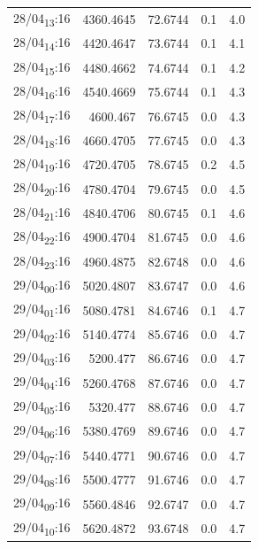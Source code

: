 \documentclass[11pt]{article}
\begin{document}
\begin{table}[htbp]
\begin{tabular}{lrrrr}
28/04\textsubscript{13}:16 & 4360.4645 & 72.6744 & 0.1 & 4.0\\[0pt]
28/04\textsubscript{14}:16 & 4420.4647 & 73.6744 & 0.1 & 4.1\\[0pt]
28/04\textsubscript{15}:16 & 4480.4662 & 74.6744 & 0.1 & 4.2\\[0pt]
28/04\textsubscript{16}:16 & 4540.4669 & 75.6744 & 0.1 & 4.3\\[0pt]
28/04\textsubscript{17}:16 & 4600.467 & 76.6745 & 0.0 & 4.3\\[0pt]
28/04\textsubscript{18}:16 & 4660.4705 & 77.6745 & 0.0 & 4.3\\[0pt]
28/04\textsubscript{19}:16 & 4720.4705 & 78.6745 & 0.2 & 4.5\\[0pt]
28/04\textsubscript{20}:16 & 4780.4704 & 79.6745 & 0.0 & 4.5\\[0pt]
28/04\textsubscript{21}:16 & 4840.4706 & 80.6745 & 0.1 & 4.6\\[0pt]
28/04\textsubscript{22}:16 & 4900.4704 & 81.6745 & 0.0 & 4.6\\[0pt]
28/04\textsubscript{23}:16 & 4960.4875 & 82.6748 & 0.0 & 4.6\\[0pt]
29/04\textsubscript{00}:16 & 5020.4807 & 83.6747 & 0.0 & 4.6\\[0pt]
29/04\textsubscript{01}:16 & 5080.4781 & 84.6746 & 0.1 & 4.7\\[0pt]
29/04\textsubscript{02}:16 & 5140.4774 & 85.6746 & 0.0 & 4.7\\[0pt]
29/04\textsubscript{03}:16 & 5200.477 & 86.6746 & 0.0 & 4.7\\[0pt]
29/04\textsubscript{04}:16 & 5260.4768 & 87.6746 & 0.0 & 4.7\\[0pt]
29/04\textsubscript{05}:16 & 5320.477 & 88.6746 & 0.0 & 4.7\\[0pt]
29/04\textsubscript{06}:16 & 5380.4769 & 89.6746 & 0.0 & 4.7\\[0pt]
29/04\textsubscript{07}:16 & 5440.4771 & 90.6746 & 0.0 & 4.7\\[0pt]
29/04\textsubscript{08}:16 & 5500.4777 & 91.6746 & 0.0 & 4.7\\[0pt]
29/04\textsubscript{09}:16 & 5560.4846 & 92.6747 & 0.0 & 4.7\\[0pt]
29/04\textsubscript{10}:16 & 5620.4872 & 93.6748 & 0.0 & 4.7\\[0pt]
\end{tabular}
\end{table}
\end{document}
